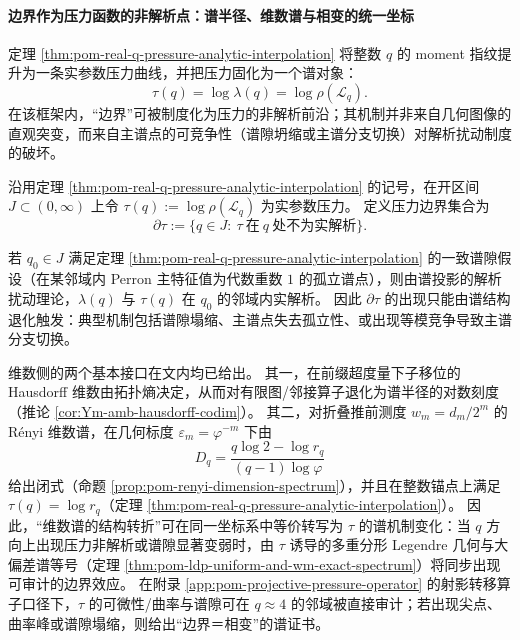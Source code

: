 
\paragraph{边界作为压力函数的非解析点：谱半径、维数谱与相变的统一坐标}
定理 \ref{thm:pom-real-q-pressure-analytic-interpolation} 将整数 \(q\) 的 moment 指纹提升为一条实参数压力曲线，并把压力固化为一个谱对象：
\[
\tau(q)=\log\lambda(q)=\log\rho(\mathcal L_q).
\]
在该框架内，“边界”可被制度化为压力的非解析前沿；其机制并非来自几何图像的直观突变，而来自主谱点的可竞争性（谱隙坍缩或主谱分支切换）对解析扰动制度的破坏。

\begin{definition}\label{def:pom-pressure-nonanalytic-boundary}
沿用定理 \ref{thm:pom-real-q-pressure-analytic-interpolation} 的记号，在开区间 \(J\subset(0,\infty)\) 上令
\(
\tau(q):=\log\rho(\mathcal L_q)
\)
为实参数压力。
定义压力边界集合为
\[
\partial\tau:=\{q\in J:\ \tau\ \text{在}\ q\ \text{处不为实解析}\}.
\]
\end{definition}

\begin{remark}[谱隙制度下的解析性与边界触发机制]\label{rem:pom-nonanalyticity-as-spectral-gap-closure}
若 \(q_0\in J\) 满足定理 \ref{thm:pom-real-q-pressure-analytic-interpolation} 的一致谱隙假设（在某邻域内 Perron 主特征值为代数重数 \(1\) 的孤立谱点），则由谱投影的解析扰动理论，\(\lambda(q)\) 与 \(\tau(q)\) 在 \(q_0\) 的邻域内实解析。
因此 \(\partial\tau\) 的出现只能由谱结构退化触发：典型机制包括谱隙塌缩、主谱点失去孤立性、或出现等模竞争导致主谱分支切换。
\end{remark}

\begin{remark}\label{rem:pom-dimension-matrix-pressure-unified}
维数侧的两个基本接口在文内均已给出。
其一，在前缀超度量下子移位的 Hausdorff 维数由拓扑熵决定，从而对有限图/邻接算子退化为谱半径的对数刻度（推论 \ref{cor:Ym-amb-hausdorff-codim}）。
其二，对折叠推前测度 \(w_m=d_m/2^m\) 的 Rényi 维数谱，在几何标度 \(\varepsilon_m=\varphi^{-m}\) 下由
\[
D_q=\frac{q\log 2-\log r_q}{(q-1)\log\varphi}
\]
给出闭式（命题 \ref{prop:pom-renyi-dimension-spectrum}），并且在整数锚点上满足 \(\tau(q)=\log r_q\)（定理 \ref{thm:pom-real-q-pressure-analytic-interpolation}）。
因此，“维数谱的结构转折”可在同一坐标系中等价转写为 \(\tau\) 的谱机制变化：当 \(q\) 方向上出现压力非解析或谱隙显著变弱时，由 \(\tau\) 诱导的多重分形 Legendre 几何与大偏差谱等号（定理 \ref{thm:pom-ldp-uniform-and-wm-exact-spectrum}）将同步出现可审计的边界效应。
在附录 \ref{app:pom-projective-pressure-operator} 的射影转移算子口径下，\(\tau\) 的可微性/曲率与谱隙可在 \(q\approx 4\) 的邻域被直接审计；若出现尖点、曲率峰或谱隙塌缩，则给出“边界＝相变”的谱证书。
\end{remark}

